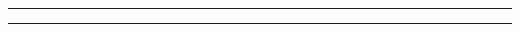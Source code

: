 \begin{problem}{9.8}

\end{problem}

\begin{solution}


\end{solution}

\noindent\rule{7in}{1.5pt}


\begin{problem}{9.9}

\end{problem}

\begin{solution}


\end{solution}

\noindent\rule{7in}{1.5pt}

